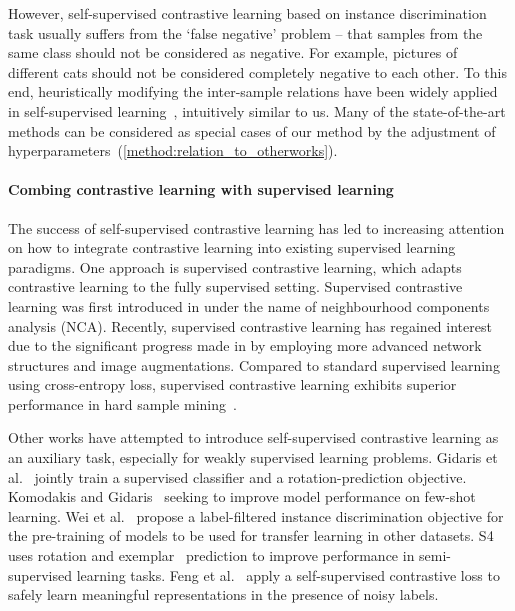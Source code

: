 \documentclass[10pt,twocolumn,letterpaper]{article}
\begin{document}
However, self-supervised contrastive learning based on instance discrimination task usually suffers from the `false negative' problem -- that samples from the same class should not be considered as negative. For example, pictures of different cats should not be considered completely negative to each other. To this end, heuristically modifying the inter-sample relations have been widely applied in self-supervised learning~\cite{dwibedi2021nnclr, meanshift, CLID, ascl}, intuitively similar to us. Many of the state-of-the-art methods can be considered as special cases of our method by the adjustment of hyperparameters~(\cref{method:relation_to_otherworks}).

\paragraph{Combing contrastive learning with supervised learning}
\label{sec:combination_rw}
The success of self-supervised contrastive learning has led to increasing attention on how to integrate contrastive learning into existing supervised learning paradigms. One approach is supervised contrastive learning, which adapts contrastive learning to the fully supervised setting. Supervised contrastive learning was first introduced in \cite{nca, cns} under the name of neighbourhood components analysis (NCA). Recently, supervised contrastive learning has regained interest due to the significant progress made in \cite{supcon} by employing more advanced network structures and image augmentations. Compared to standard supervised learning using cross-entropy loss, supervised contrastive learning exhibits superior performance in hard sample mining~\cite{supcon}.

Other works have attempted to introduce self-supervised contrastive learning as an auxiliary task, especially for weakly supervised learning problems. Gidaris et al.~\cite{gidaris2019boosting} jointly train a supervised classifier and a rotation-prediction objective. Komodakis and Gidaris~\cite{komodakis2018unsupervised} seeking to improve model performance on few-shot learning. Wei et al.~\cite{wei2020can} propose a label-filtered instance discrimination objective for the pre-training of models to be used for transfer learning in other datasets. S4~\cite{zhai2019s4l} uses rotation and exemplar~\cite{dosovitskiy2014discriminative} prediction to improve performance in semi-supervised learning tasks. Feng et al.~\cite{ssr} apply a self-supervised contrastive loss to safely learn meaningful representations in the presence of noisy labels.
\end{document}

